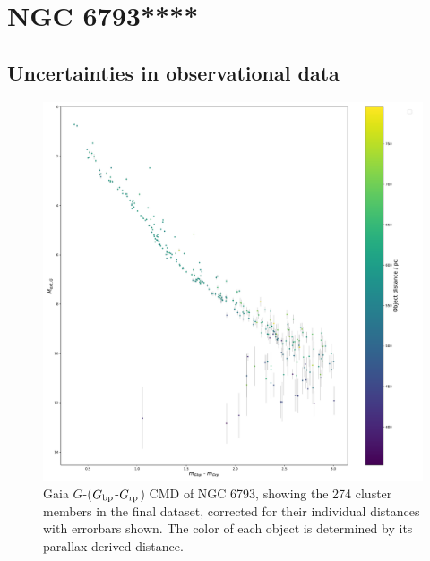 \documentclass[12pt, a4paper]{report}
\begin{document}
\section{NGC 6793****}
\subsection{Uncertainties in observational data}

\begin{figure}[h!]
\begin{center}
\includegraphics[width=1.0\textwidth]{../NGC_6793_CMD_observational_errorbars.pdf}
\caption{Gaia $G$-($G_{\textnormal{bp}}$-$G_{\textnormal{rp}}$) CMD of NGC 6793, showing the 274 cluster members in the final dataset, corrected for their individual distances with errorbars shown. The color of each object is determined by its parallax-derived distance.}
\label{NGC_6793_obs_only}
\end{center}
\end{figure}
\end{document}
